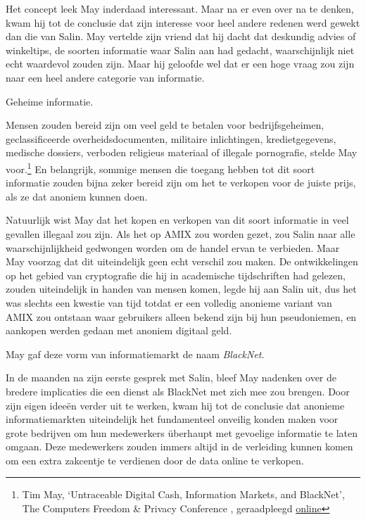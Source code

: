 \documentclass[smalldemyvopaper,11pt,twoside,onecolumn,openright,extrafontsizes,hidelinks]{memoir}
\begin{document}
Het concept leek May inderdaad interessant. Maar na er even over na te
denken, kwam hij tot de conclusie dat zijn interesse voor heel andere
redenen werd gewekt dan die van Salin. May vertelde zijn vriend dat hij
dacht dat deskundig advies of winkeltips, de soorten informatie waar
Salin aan had gedacht, waarschijnlijk niet echt waardevol zouden zijn.
Maar hij geloofde wel dat er een hoge vraag zou zijn naar een heel
andere categorie van informatie.

Geheime informatie.

Mensen zouden bereid zijn om veel geld te betalen voor bedrijfsgeheimen,
geclassificeerde overheidsdocumenten, militaire inlichtingen,
kredietgegevens, medische dossiers, verboden religieus materiaal of
illegale pornografie, stelde May voor.\footnote{Tim May, `Untraceable
  Digital Cash, Information Markets, and BlackNet', The Computers
  Freedom \& Privacy Conference , geraadpleegd
  \href{https://web.archive.org/web/20130501134401/https://osaka.law.miami.edu//~froomkin/articles/tcmay.htm}{online}}
En belangrijk, sommige mensen die toegang hebben tot dit soort
informatie zouden bijna zeker bereid zijn om het te verkopen voor de
juiste prijs, als ze dat anoniem kunnen doen.

Natuurlijk wist May dat het kopen en verkopen van dit soort informatie
in veel gevallen illegaal zou zijn. Als het op AMIX zou worden gezet,
zou Salin naar alle waarschijnlijkheid gedwongen worden om de handel
ervan te verbieden. Maar May voorzag dat dit uiteindelijk geen echt
verschil zou maken. De ontwikkelingen op het gebied van cryptografie die
hij in academische tijdschriften had gelezen, zouden uiteindelijk in
handen van mensen komen, legde hij aan Salin uit, dus het was slechts
een kwestie van tijd totdat er een volledig anonieme variant van AMIX
zou ontstaan waar gebruikers alleen bekend zijn bij hun pseudoniemen, en
aankopen werden gedaan met anoniem digitaal geld.

May gaf deze vorm van informatiemarkt de naam \emph{BlackNet}.

In de maanden na zijn eerste gesprek met Salin, bleef May nadenken over
de bredere implicaties die een dienst als BlackNet met zich mee zou
brengen. Door zijn eigen ideeën verder uit te werken, kwam hij tot de
conclusie dat anonieme informatiemarkten uiteindelijk het fundamenteel
onveilig konden maken voor grote bedrijven om hun medewerkers überhaupt
met gevoelige informatie te laten omgaan. Deze medewerkers zouden immers
altijd in de verleiding kunnen komen om een extra zakcentje te verdienen
door de data online te verkopen.
\end{document}
